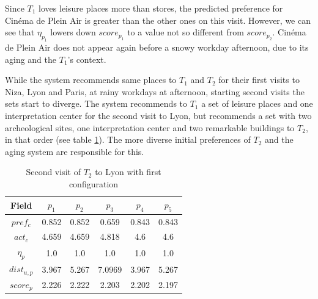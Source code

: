 Since $T_1$ loves leisure places more than stores, the predicted preference for Cinéma de Plein Air is greater than the other ones on this visit. However, we can see that $\eta_{p_1}$ lowers down $score_{p_1}$ to a value not so different from $score_{p_2}$. Cinéma de Plein Air does not appear again before a snowy workday afternoon, due to its aging and the $T_1$'s context.

While the system recommends same places to $T_1$ and $T_2$ for their first visits to Niza, Lyon and Paris, at rainy workdays at afternoon, starting second visits the sets start to diverge. The system recommends to $T_1$ a set of leisure places and one interpretation center for the second visit to Lyon, but recommends a set with two archeological sites, one interpretation center and two remarkable buildings to $T_2$, in that order (see table \ref{table:t2-1}). The more diverse initial preferences of $T_2$ and the aging system are responsible for this.

\begin{table}[h!]
    \centering
    \begin{tabular}{ |c|c|c|c|c|c| } 
        \hline
        Field   & $p_1$ & $p_2$ & $p_3$ & $p_4$ & $p_5$ \\
        \hline
        $pref_c$    &  0.852 & 0.852 & 0.659 & 0.843 & 0.843 \\
        $act_c$     & 4.659 & 4.659 & 4.818 & 4.6 & 4.6 \\
        $\eta_p$    & 1.0 & 1.0 & 1.0 & 1.0 & 1.0 \\
        $dist_{u,p}$ & 3.967 & 5.267 & 7.0969 & 3.967 & 5.267 \\
        $score_p$    & 2.226 & 2.222 & 2.203 & 2.202 & 2.197 \\
        
        \hline
    \end{tabular}
    \caption{Second visit of $T_2$ to Lyon with first configuration}
    \label{table:t2-1}
\end{table}

